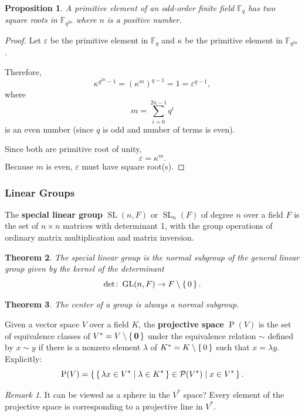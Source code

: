 \documentclass[12pt, letterpaper]{article}
\newcommand{\field}{\mathbb{F}}
\newcommand{\GL}{\operatorname{GL}}
\newcommand{\SL}{\operatorname{SL}}
\newcommand{\power}{\mathcal{P}}
\newtheorem{prop}{Proposition}[section]
\newtheorem{thm}[prop]{Theorem}
\theoremstyle{definition}
\theoremstyle{remark}
\newtheorem*{rem*}{Remark}
\theoremstyle{definition}
\theoremstyle{plain}
\numberwithin{equation}{section}
\begin{document}
	\begin{prop}\label{propPrimHasSqrtInExtension}
		A primitive element of an odd-order finite field $\field_q$ has two square roots in $\field_{q^{2n}}$
		where $n$ is a positive number.
	\end{prop}
	\begin{proof}
		Let $\varepsilon$ be the primitive element in $\field_q$
		and $\kappa$ be the primitive element in $\field_{q^{2n}}$.
		
		Therefore, \[\kappa^{q^{2n}-1}=(\kappa^{m})^{q-1}=1=\varepsilon^{q-1},\]
		where \[m=\sum_{i=0}^{2n-1}q^i\]
		is an even number (since $q$ is odd and number of terms is even).
		
		Since both are primitive root of unity,
		\[ \varepsilon=\kappa^m.\]
		Because $m$ is even, $\varepsilon$ must have square root(s).
	\end{proof}

	\subsubsection{Linear Groups}
	\begin{def*}
		The \textbf{special linear group} $\SL(n, F)$ or $\SL_n(F)$ of degree $n$ over a field $F$
		is the set of $n\times n$ matrices with determinant 1,
		with the group operations of ordinary matrix multiplication and matrix inversion.
	\end{def*}
	\begin{thm}
		The special linear group is the normal subgroup of the general linear group given by the kernel of the determinant
		\[\det\colon\GL(n,F)\to F\setminus\set{0}. \]
	\end{thm}

	\begin{thm}
		The center of a group is always a normal subgroup.
	\end{thm}

	\begin{def*}
		Given a vector space $V$ over a field $K$, the \textbf{projective space} $\operatorname{P}(V)$
		is the set of equivalence classes of $V^*=V \setminus\set{\mathbf{0}}$ under the equivalence relation
		$\sim$ defined by $x \sim y$ if there is a nonzero element $\lambda$ of $K^*=K\setminus\set{0}$ such that $x = \lambda y$.
		Explicitly:
		\[\operatorname{P}(V)=\set{\set{\lambda x\in V^*|\lambda\in K^*}\in\power(V^*)|x\in V^*} .\]
	\end{def*}
	\begin{rem*}
		It can be viewed as a sphere in the $V^*$ space?
		Every element of the projective space is corresponding to a projective line in $V^*$.
	\end{rem*}
\end{document}
